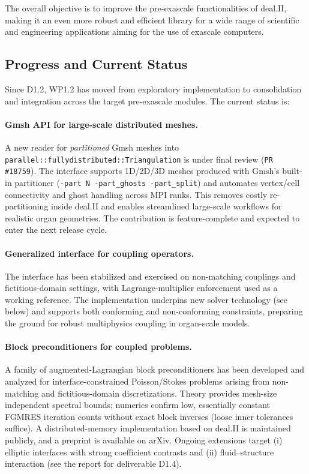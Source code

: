 \documentclass[a4paper,12pt]{article}
\begin{document}
The overall objective is to improve the pre-exascale functionalities of deal.II,
making it an even more robust and efficient library for a wide range of
scientific and engineering applications aiming for the use of exascale
computers.

\subsection{Progress and Current Status}

Since D1.2, WP1.2 has moved from exploratory implementation to consolidation and
integration across the target pre-exascale modules. The current status is:

\paragraph{Gmsh API for large-scale distributed meshes.}
A new reader for \emph{partitioned} Gmsh meshes into
\texttt{parallel::fullydistributed::Triangulation} is under final review
(\texttt{PR \#18759}). The interface supports 1D/2D/3D meshes produced with
Gmsh's built-in partitioner (\verb|-part N -part_ghosts -part_split|) and
automates vertex/cell connectivity and ghost handling across MPI ranks. This
removes costly re-partition\-ing inside deal.II and enables streamlined
large-scale workflows for realistic organ geometries. The contribution is
feature-complete and expected to enter the next release cycle.

\paragraph{Generalized interface for coupling operators.}
The interface has been stabilized and exercised on non-matching couplings and
fictitious-domain settings, with Lagrange-multiplier enforcement used as a
working reference. The implementation underpins new solver technology (see
below) and supports both conforming and non-conforming constraints, preparing
the ground for robust multiphysics coupling in organ-scale models.

\paragraph{Block preconditioners for coupled problems.}
A family of augmented-Lagrangian block preconditioners has been developed and
analyzed for interface-constrained Poisson/Stokes problems arising from
non-matching and fictitious-domain discretizations. Theory provides mesh-size
independent spectral bounds; numerics confirm low, essentially constant FGMRES
iteration counts without exact block inverses (loose inner tolerances suffice).
A distributed-memory implementation based on deal.II is maintained publicly, and
a preprint is available on arXiv. Ongoing extensions target (i) elliptic
interfaces with strong coefficient contrasts and (ii) fluid–struc\-ture
interaction (see the report for deliverable D1.4).
\end{document}
